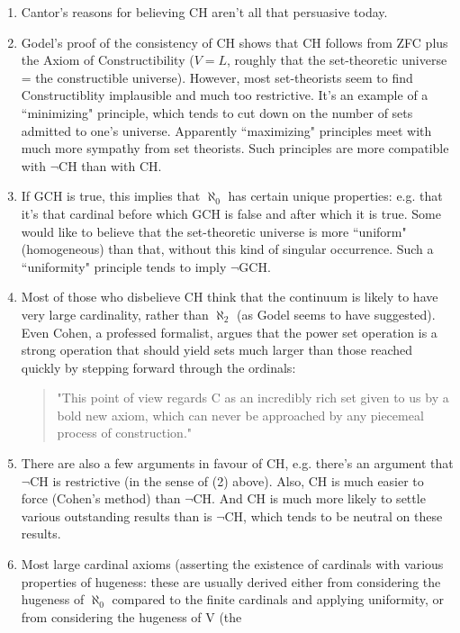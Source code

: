 \begin{enumerate}
\item Cantor's reasons for believing CH aren't all that persuasive today.
\item Godel's proof of the consistency of CH shows that CH follows from
    ZFC plus the Axiom of Constructibility ($V=L$, roughly that the set-theoretic
    universe = the constructible universe).  However, most set-theorists
    seem to find Constructiblity implausible and much too restrictive.  It's
    an example of a ``minimizing" principle, which tends to cut down on
    the number of sets admitted to one's universe.  Apparently ``maximizing"
    principles meet with much more sympathy from set theorists.  Such
    principles are more compatible with $\neg$CH than with CH.
\item If GCH is true, this implies that $\aleph_0$ has certain unique properties:
    e.g. that it's that cardinal before which GCH is false and after which
    it is true.  Some would like to believe that the set-theoretic universe
    is more ``uniform" (homogeneous) than that, without this kind of
    singular occurrence.  Such a ``uniformity" principle tends to imply $\neg$GCH.
\item Most of those who disbelieve CH think that the continuum is likely to
    have very large cardinality, rather than $\aleph_2$ (as Godel seems to
    have suggested).  Even Cohen, a professed formalist, argues that the
    power set operation is a strong operation that should yield sets
    much larger than those reached quickly by stepping forward through the
    ordinals:
\begin{quote}
      "This point of view regards C as an incredibly rich set given to us
       by a bold new axiom, which can never be approached by any piecemeal
       process of construction."
\end{quote}
\item There are also a few arguments in favour of CH, e.g. there's an argument
    that $\neg$CH is restrictive (in the sense of (2) above).  Also, CH is
    much easier to force (Cohen's method) than $\neg$CH.  And CH is much more
    likely to settle various outstanding results than is $\neg$CH, which tends
    to be neutral on these results.
\item Most large cardinal axioms (asserting the existence of cardinals with
    various properties of hugeness: these are usually derived either from
    considering the hugeness of $\aleph_0$ compared to the finite cardinals
    and applying uniformity, or from considering the hugeness of V (the

\end{enumerate}
